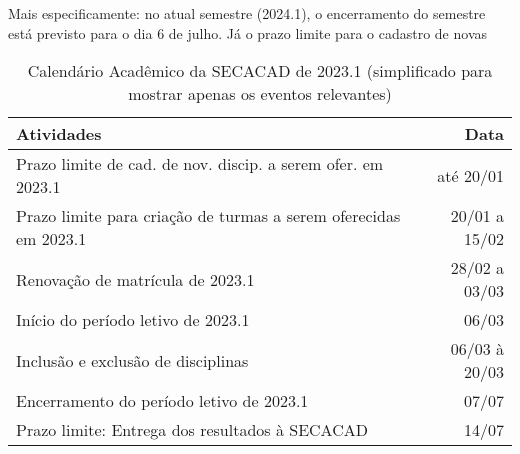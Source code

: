 Mais especificamente: no atual semestre (2024.1), o encerramento do semestre está previsto para o dia 6 de julho. Já o prazo limite para o cadastro de novas

\begin{table}[H] \centering \caption{Calendário Acadêmico da SECACAD de 2023.1 (simplificado para mostrar apenas os eventos relevantes)} \label{tab:calendario_SECACAD-2023.1}
  \begin{tabular}{| l r |}
    \hline
    \textbf{Atividades}                                              & \textbf{Data} \\
    \hline
    Prazo limite de cad. de nov. discip. a serem ofer. em 2023.1     & até 20/01     \\
    Prazo limite para criação de turmas a serem oferecidas em 2023.1 & 20/01 a 15/02 \\
    Renovação de matrícula de 2023.1                                 & 28/02 a 03/03 \\
    Início do período letivo de 2023.1                               & 06/03         \\
    Inclusão e exclusão de disciplinas                               & 06/03 à 20/03 \\
    Encerramento do período letivo de 2023.1                         & 07/07         \\
    Prazo limite: Entrega dos resultados à SECACAD                   & 14/07         \\
    \hline
  \end{tabular}
\end{table}


